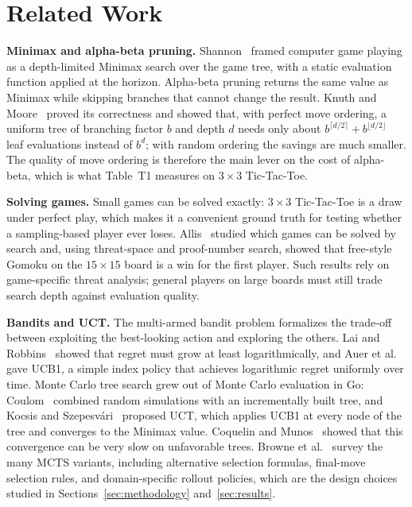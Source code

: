\section{Related Work}
\label{sec:related_work}

\textbf{Minimax and alpha-beta pruning.} Shannon~\cite{shannon1950programming} framed computer game playing as a depth-limited Minimax search over the game tree, with a static evaluation function applied at the horizon. Alpha-beta pruning returns the same value as Minimax while skipping branches that cannot change the result. Knuth and Moore~\cite{knuth1975analysis} proved its correctness and showed that, with perfect move ordering, a uniform tree of branching factor $b$ and depth $d$ needs only about $b^{\lceil d/2\rceil}+b^{\lfloor d/2\rfloor}$ leaf evaluations instead of $b^d$; with random ordering the savings are much smaller. The quality of move ordering is therefore the main lever on the cost of alpha-beta, which is what Table~T1 measures on $3\times 3$ Tic-Tac-Toe.

\textbf{Solving games.} Small games can be solved exactly: $3\times 3$ Tic-Tac-Toe is a draw under perfect play, which makes it a convenient ground truth for testing whether a sampling-based player ever loses. Allis~\cite{allis1994searching} studied which games can be solved by search and, using threat-space and proof-number search, showed that free-style Gomoku on the $15\times 15$ board is a win for the first player. Such results rely on game-specific threat analysis; general players on large boards must still trade search depth against evaluation quality.

\textbf{Bandits and UCT.} The multi-armed bandit problem formalizes the trade-off between exploiting the best-looking action and exploring the others. Lai and Robbins~\cite{lai1985asymptotically} showed that regret must grow at least logarithmically, and Auer et al.~\cite{auer2002finite} gave UCB1, a simple index policy that achieves logarithmic regret uniformly over time. Monte Carlo tree search grew out of Monte Carlo evaluation in Go: Coulom~\cite{coulom2006efficient} combined random simulations with an incrementally built tree, and Kocsis and Szepesv\'ari~\cite{kocsis2006bandit} proposed UCT, which applies UCB1 at every node of the tree and converges to the Minimax value. Coquelin and Munos~\cite{coquelin2007bandit} showed that this convergence can be very slow on unfavorable trees. Browne et al.~\cite{browne2012survey} survey the many MCTS variants, including alternative selection formulas, final-move selection rules, and domain-specific rollout policies, which are the design choices studied in Sections~\ref{sec:methodology} and~\ref{sec:results}.

